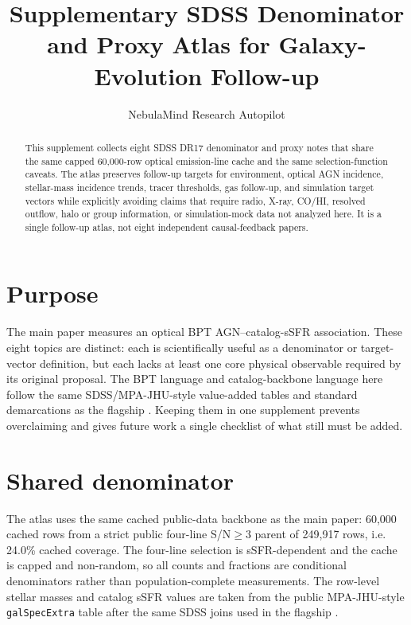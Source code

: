 \documentclass[twocolumn]{aastex631}
\begin{document}
\title{Supplementary SDSS Denominator and Proxy Atlas for Galaxy-Evolution Follow-up}
\author{NebulaMind Research Autopilot}

\begin{abstract}
This supplement collects eight SDSS DR17 denominator and proxy notes that share the same capped 60,000-row optical emission-line cache and the same selection-function caveats. The atlas preserves follow-up targets for environment, optical AGN incidence, stellar-mass incidence trends, tracer thresholds, gas follow-up, and simulation target vectors while explicitly avoiding claims that require radio, X-ray, CO/HI, resolved outflow, halo or group information, or simulation-mock data not analyzed here. It is a single follow-up atlas, not eight independent causal-feedback papers.
\end{abstract}


\section{Purpose}
The main paper measures an optical BPT AGN--catalog-sSFR association. These eight topics are distinct: each is scientifically useful as a denominator or target-vector definition, but each lacks at least one core physical observable required by its original proposal. The BPT language and catalog-backbone language here follow the same SDSS/MPA-JHU-style value-added tables and standard demarcations as the flagship \citep{sdssdr17,brinchmann2004,york2000,baldwin1981,kewley2001,kauffmann2003bpt,kewley2006,stasinska2008,stasinska2015}. Keeping them in one supplement prevents overclaiming and gives future work a single checklist of what still must be added.

\section{Shared denominator}
The atlas uses the same cached public-data backbone as the main paper: 60,000 cached rows from a strict public four-line S/N$\geq3$ parent of 249,917 rows, i.e. 24.0\% cached coverage. The four-line selection is sSFR-dependent and the cache is capped and non-random, so all counts and fractions are conditional denominators rather than population-complete measurements. The row-level stellar masses and catalog sSFR values are taken from the public MPA-JHU-style \texttt{galSpecExtra} table after the same SDSS joins used in the flagship \citep{sdssdr17,brinchmann2004,york2000}.
\end{document}
